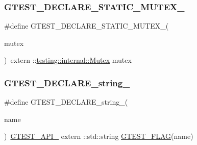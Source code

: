 \subsubsection{\texorpdfstring{GTEST\_DECLARE\_STATIC\_MUTEX\_}{GTEST\_DECLARE\_STATIC\_MUTEX\_}}
{\footnotesize\ttfamily \#define G\+T\+E\+S\+T\+\_\+\+D\+E\+C\+L\+A\+R\+E\+\_\+\+S\+T\+A\+T\+I\+C\+\_\+\+M\+U\+T\+E\+X\+\_\+(\begin{DoxyParamCaption}\item[{}]{mutex }\end{DoxyParamCaption})~extern \+::\mbox{\hyperlink{classtesting_1_1internal_1_1_mutex}{testing\+::internal\+::\+Mutex}} mutex}

\mbox{\label{_obj__test_2lib_2googletest-release-1_88_81_2googletest_2include_2gtest_2internal_2gtest-port_8h_a9f74eee05f7ee5534139a622fe7da7dd}} 
\subsubsection{\texorpdfstring{GTEST\_DECLARE\_string\_}{GTEST\_DECLARE\_string\_}}
{\footnotesize\ttfamily \#define G\+T\+E\+S\+T\+\_\+\+D\+E\+C\+L\+A\+R\+E\+\_\+string\+\_\+(\begin{DoxyParamCaption}\item[{}]{name }\end{DoxyParamCaption})~\mbox{\hyperlink{_obj__test_2lib_2googletest-release-1_88_81_2googletest_2include_2gtest_2internal_2gtest-port_8h_aa73be6f0ba4a7456180a94904ce17790}{G\+T\+E\+S\+T\+\_\+\+A\+P\+I\+\_\+}} extern \+::std\+::string \mbox{\hyperlink{_obj__test_2lib_2googletest-release-1_88_81_2googletest_2include_2gtest_2internal_2gtest-port_8h_a828f4e34a1c4b510da50ec1563e3562a}{G\+T\+E\+S\+T\+\_\+\+F\+L\+AG}}(name)}

\mbox{\label{_obj__test_2lib_2googletest-release-1_88_81_2googletest_2include_2gtest_2internal_2gtest-port_8h_a491d09ee62f1c9cfeafa3dbf75aaa9e2}} 
